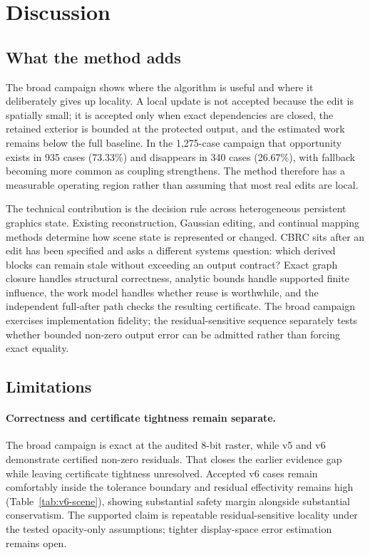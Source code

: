 \documentclass[acmtog,nonacm]{acmart}
\newcommand{\method}{CBRC}
\begin{document}
\section{Discussion}
\subsection{What the method adds}
The broad campaign shows where the algorithm is useful and where it deliberately gives up locality. A local update is not accepted because the edit is spatially small; it is accepted only when exact dependencies are closed, the retained exterior is bounded at the protected output, and the estimated work remains below the full baseline. In the 1,275-case campaign that opportunity exists in 935 cases (73.33\%) and disappears in 340 cases (26.67\%), with fallback becoming more common as coupling strengthens. The method therefore has a measurable operating region rather than assuming that most real edits are local.

The technical contribution is the decision rule across heterogeneous persistent graphics state. Existing reconstruction, Gaussian editing, and continual mapping methods determine how scene state is represented or changed. \method{} sits after an edit has been specified and asks a different systems question: which derived blocks can remain stale without exceeding an output contract? Exact graph closure handles structural correctness, analytic bounds handle supported finite influence, the work model handles whether reuse is worthwhile, and the independent full-after path checks the resulting certificate. The broad campaign exercises implementation fidelity; the residual-sensitive sequence separately tests whether bounded non-zero output error can be admitted rather than forcing exact equality.

\subsection{Limitations}
\paragraph{Correctness and certificate tightness remain separate.}
The broad campaign is exact at the audited 8-bit raster, while v5 and v6 demonstrate certified non-zero residuals. That closes the earlier evidence gap while leaving certificate tightness unresolved. Accepted v6 cases remain comfortably inside the tolerance boundary and residual effectivity remains high (Table~\ref{tab:v6-scene}), showing substantial safety margin alongside substantial conservatism. The supported claim is repeatable residual-sensitive locality under the tested opacity-only assumptions; tighter display-space error estimation remains open.
\end{document}
